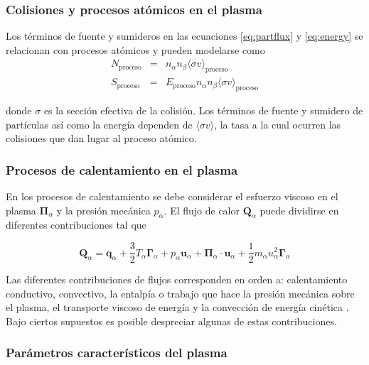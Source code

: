\subsubsection{Colisiones y procesos atómicos en el plasma}

Los términos de fuente y sumideros en las ecuaciones \eqref{eq:partflux} y \eqref{eq:energy} se relacionan con procesos atómicos y pueden modelarse como \cite{goldston1995}
\begin{eqnarray}
	N_\text{proceso} &=& n_\alpha n_\beta \langle \sigma v \rangle_\text{proceso}\label{eq:particlesSS}\\
	S_\text{proceso} &=& E_\text{proceso} n_\alpha n_\beta \langle \sigma v \rangle_\text{proceso} \label{eq:energySS}
\end{eqnarray}

donde $\sigma$ es la sección efectiva de la colisión. Los términos de fuente y sumidero de partículas así como la energía dependen de $\langle \sigma v\rangle$, la tasa a la cual ocurren las colisiones que dan lugar al proceso atómico.  

\subsubsection{Procesos de calentamiento en el plasma}

En los procesos de calentamiento se debe considerar el esfuerzo viscoso en el plasma $\bm{\Pi}_\alpha$ y la presión mecánica $p_\alpha$. El flujo de calor $\bm{Q}_\alpha$ puede dividirse en diferentes contribuciones tal que

\begin{equation}\label{eq:heatflux}
    \textbf{Q}_\alpha = \textbf{q}_\alpha + \frac{3}{2}T_\alpha\pmb{\Gamma}_\alpha + p_\alpha\textbf{u}_\alpha + \pmb{\Pi}_\alpha\cdot\textbf{u}_\alpha + \frac{1}{2}m_\alpha u_\alpha^2\pmb{\Gamma}_\alpha
  \end{equation}
 
 Las diferentes contribuciones de flujos corresponden en orden a: calentamiento conductivo, convectivo, la entalpía o trabajo que hace la presión mecánica sobre el plasma, el transporte viscoso de energía y la convección de energía cinética \cite{helander2005}. Bajo ciertos supuestos es posible despreciar algunas de estas contribuciones. 
 
 \subsubsection{Parámetros característicos del plasma}
 
